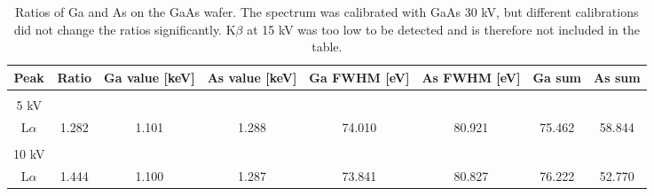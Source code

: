 \begin{table}[ht]
    \centering
    \caption{
        Ratios of Ga and As on the GaAs wafer.
        The spectrum was calibrated with GaAs 30 kV, but different calibrations did not change the ratios significantly. 
        K$\beta$ at 15 kV was too low to be detected and is therefore not included in the table.
    }
    \label{tab:results:ratios}
    \begin{tabular}{cccccccc}

        Peak                         & Ratio & Ga value [keV] & As value [keV] & Ga FWHM [eV] & As FWHM [eV] & Ga sum  & As sum \\
        \hline
                                     &       &                &                &              &              &         &        \\

        5 kV                         &       &                &                &              &              &         &        \\
        L$\alpha$                    & 1.282 & 1.101          & 1.288          & 74.010       & 80.921       & 75.462  & 58.844 \\
        \hline
                                     &       &                &                &              &              &         &        \\
        10 kV                        &       &                &                &              &              &         &        \\
        L$\alpha$                    & 1.444 & 1.100          & 1.287          & 73.841       & 80.827       & 76.222  & 52.770 \\


\end{tabular}
\end{table}
